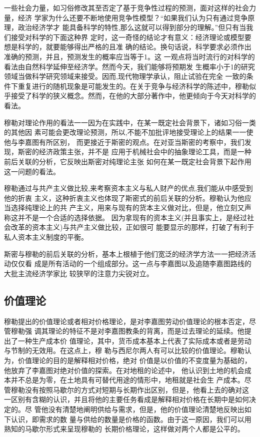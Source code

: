 一些社会力量，如习俗修改其至否定了基于竞争性过程的预测，面对这样的社会力量，经济
学家为什么还要不断地使用竞争性模型？“如果我们认为只有通过竞争原理，政治经济学才
能具备科学的特性,那么这就可以得到部分的理解。”但只有当我们接受对科学的下面这种界
定时，这一奇怪的结论才有意义：经济理论或模型要想是科学的，就要能够得出严格的且准
确的结论。换句话说，科学要求必须作出准确的预测，并且，预测发生的概率应当等于1。这
一观点将当时流行的对科学的看法由自然科学延伸至经济学。然而今天，我们能够将预期发
生概率小于1的研究领域当做科学研究领域来接受。因而,现代物理学承认，阻止试验在完全
一致的条件下重复进行的随机现象是可能发生的。在关于竞争与经济科学的陈述中，穆勒似
乎接受了科学的狭义概念。然而，在他的大部分著作中，他更倾向于今天对科学的看法。


穆勒对理论作用的看法一一因为在实践中，在某一既定社会背景下，诸如习俗一类的其他因
素可能会更改理论预测，所以,不能不加批评地接受理论上的结果一一使他与李嘉图有所区别，
而更接近于斯密的观点。在对亚当斯密的考察中，我们发现，斯密的经济政策主张，并不是
应用于机械社会中的抽象理论工具，而是一种前后关联的分析，它反映出斯密对纯理论主张
如何在某一既定社会背景下起作用这一问题的看法。

穆勒通过与共产主义做比较,来考察资本主义与私人财产的优点,我们能从中感受到他的折衷
主义，这种折衷主义也体现了斯密式的前后关联的分析。穆勒认为他应当选择纯理论上的共
产主义，用来与现有的货本主义做对比，但是，他立刻又声称这并不是一个合适的选择依据。
因为拿现有的资本主义(并且事实上，是经过社会改革的资本主义)与共产主义做比较，正如很可
能要显示的那样，打破了有利于私人资本主义制度的平衡。

斯密与穆勒的前后关联的分析，基本上根植于他们宽泛的经济学方法一一把经济活动仅仅看
成是所有活动的一个组成部分。这一点与李嘉图以及追随李嘉图路线的大批主流经济学家比
较狭罕的注意力尖锐对立。

\subsection{价值理论}

穆勒提出的价值理论或者相对价格理论，是对李嘉图劳动价值理论的根本否定，尽管穆勒强
调其理论的特征不是对李嘉图教条的背离，而是过去理论的延续。他提出了一种生产成本价
值理论，其中，货币成本基本上代表了实际成本或者是劳动与节制的无效用。在这点上，穆
勒与西尼尔两人有可以比较的价值理论。穆勒认为，价值理论的目的是解释相对价格，绝对
价值是以价值的不变度量为基础的，他放弃了李嘉图对绝对价值的探索。在对地租的论述中，
他认识到土地的机会成本并不总是为零，在土地具有可替代用途的情形中，地租就是社会生
产成本。尽管穆勒没有按照马歇尔的方式对短期与长期作出区别，但是，他看上去的确对这
一区别有含糊的认识，并且将他的主要任务看成是解释相对价格在长期中是如何决定的。尽
管他没有清楚地阐明供给与需求，但是，他的价值理论清楚地反映出如下认识，即需求的数
量与供给的数量是价格的函数。由于这一原因，我们可以用熟知的马歇尔形式来呈现穆勒的
长期价格理论，这样做对两个人都是公平的。

